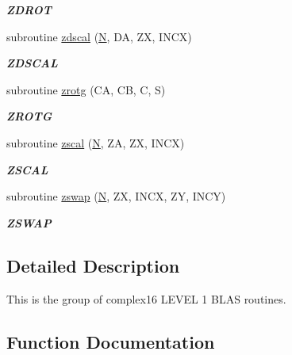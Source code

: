 \begin{DoxyCompactItemize}
\begin{DoxyCompactList}\small\item\em {\bfseries Z\+D\+R\+O\+T} \end{DoxyCompactList}\item 
subroutine \hyperlink{group__complex16__blas__level1_ga26b12037cfbbebe5bde3faadc557e30b}{zdscal} (\hyperlink{polmisc_8c_a0240ac851181b84ac374872dc5434ee4}{N}, D\+A, Z\+X, I\+N\+C\+X)
\begin{DoxyCompactList}\small\item\em {\bfseries Z\+D\+S\+C\+A\+L} \end{DoxyCompactList}\item 
subroutine \hyperlink{group__complex16__blas__level1_gabaa4dfc937ebc2c9f2129d843a80d56e}{zrotg} (C\+A, C\+B, C, S)
\begin{DoxyCompactList}\small\item\em {\bfseries Z\+R\+O\+T\+G} \end{DoxyCompactList}\item 
subroutine \hyperlink{group__complex16__blas__level1_gaceea1208dcd46b6e5468fbfb53b9281b}{zscal} (\hyperlink{polmisc_8c_a0240ac851181b84ac374872dc5434ee4}{N}, Z\+A, Z\+X, I\+N\+C\+X)
\begin{DoxyCompactList}\small\item\em {\bfseries Z\+S\+C\+A\+L} \end{DoxyCompactList}\item 
subroutine \hyperlink{group__complex16__blas__level1_ga13a187010a0cae1fef2820072404e857}{zswap} (\hyperlink{polmisc_8c_a0240ac851181b84ac374872dc5434ee4}{N}, Z\+X, I\+N\+C\+X, Z\+Y, I\+N\+C\+Y)
\begin{DoxyCompactList}\small\item\em {\bfseries Z\+S\+W\+A\+P} \end{DoxyCompactList}\end{DoxyCompactItemize}


\subsection{Detailed Description}
This is the group of complex16 L\+E\+V\+E\+L 1 B\+L\+A\+S routines. 

\subsection{Function Documentation}
\hypertarget{group__complex16__blas__level1_ga51cb4e3c658f121bdfb5f29a6c0a0bfb}{}
